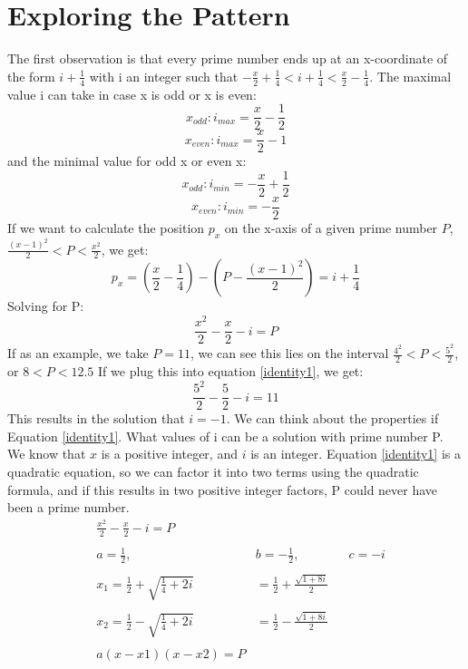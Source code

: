 \documentclass[12pt]{article}
\begin{document}
\section{Exploring the Pattern}
The first observation is that every prime number ends up at an x-coordinate of the form $i+\frac{1}{4}$ with i an integer such that $-\frac{x}{2}+\frac{1}{4}<i+\frac{1}{4}<\frac{x}{2}-\frac{1}{4}$.
The maximal value i can take in case x is odd or x is even:
\begin{equation}
x_{odd}:	i_{max} = \frac{x}{2}-\frac{1}{2}
\label{imaxodd}
\end{equation}
\begin{equation}
x_{even}: i_{max} = \frac{x}{2}-1
\end{equation}
and the minimal value for odd x or even x:
\begin{equation}
x_{odd}:	i_{min} = -\frac{x}{2}+\frac{1}{2}
\end{equation}
\begin{equation}
x_{even}: i_{min} = -\frac{x}{2}
\end{equation}
If we want to calculate the position $p_x$ on the x-axis of a given prime number $P$, $\frac{(x-1)^2}{2} < P < \frac{x^2}{2}$, we get:
\begin{equation}
p_x = \left(\frac{x}{2}-\frac{1}{4}\right) - \left(P - \frac{(x-1)^2}{2}\right) = i+\frac{1}{4}
\end{equation}
Solving for P:
\begin{equation}
\frac{x^2}{2}-\frac{x}{2}-i = P
\label{identity1}
\end{equation}
If as an example, we take $P=11$, we can see this lies on the interval $\frac{4^2}{2}<P<\frac{5^2}{2}$, or $8<P<12.5$
If we plug this into equation \ref{identity1}, we get:
\begin{equation}
\frac{5^2}{2} - \frac{5}{2} -i = 11
\end{equation}
This results in the solution that $i=-1$.
We can think about the properties if Equation \ref{identity1}. What values of i can be a solution with prime number P. We know that $x$ is a positive integer, and $i$ is an integer. Equation \ref{identity1} is a quadratic equation, so we can factor it into two terms using the quadratic formula, and if this results in two positive integer factors, P could never have been a prime number.
\begin{align*}
&\frac{x^2}{2}-\frac{x}{2}-i = P \\\\
&a  = \frac{1}{2}, &b  = -\frac{1}{2}, &&c = -i\\\\
&x_1 = \frac{1}{2} + \sqrt{\frac{1}{4} + 2i} &=\frac{1}{2} + \frac{\sqrt{1 + 8i}}{2}\\\\
&x_2 = \frac{1}{2} - \sqrt{\frac{1}{4} + 2i} &=\frac{1}{2} - \frac{\sqrt{1 + 8i}}{2}\\\\
&a(x-x1)(x-x2)=P
\end{align*}
\end{document}
